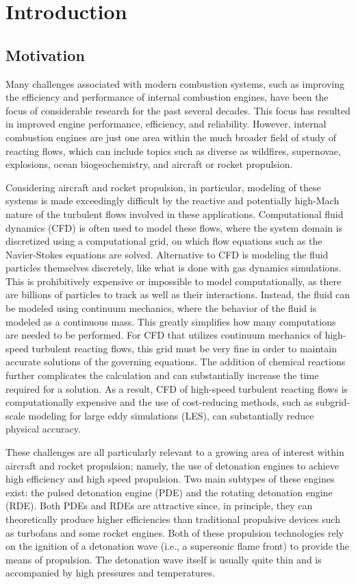 \chapter{Introduction}
\label{introchap}


\section{Motivation}
Many challenges associated with modern combustion systems, such as improving the efficiency and performance of internal combustion engines, have been the focus of considerable research for the past several decades. This focus has resulted in improved engine performance, efficiency, and reliability. However, internal combustion engines are just one area within the much broader field of study of reacting flows, which can include topics such as diverse as wildfires, supernovae, explosions, ocean biogeochemistry, and aircraft or rocket propulsion.

Considering aircraft and rocket propulsion, in particular, modeling of these systems is made exceedingly difficult by the reactive and potentially high-Mach nature of the turbulent flows involved in these applications. Computational fluid dynamics (CFD) is often used to model these flows, where the system domain is discretized using a computational grid, on which flow equations such as the Navier-Stokes equations are solved. Alternative to CFD is modeling the fluid particles themselves discretely, like what is done with gas dynamics simulations. This is prohibitively expensive or impossible to model computationally, as there are billions of particles to track as well as their interactions. Instead, the fluid can be modeled using continuum mechanics, where the behavior of the fluid is modeled as a continuous mass. This greatly simplifies how many computations are needed to be performed. For CFD that utilizes continuum mechanics of high-speed turbulent reacting flows, this grid must be very fine in order to maintain accurate solutions of the governing equations. The addition of chemical reactions further complicates the calculation and can substantially increase the time required for a solution. As a result, CFD of high-speed turbulent reacting flows is computationally expensive and the use of cost-reducing methods, such as subgrid-scale modeling for large eddy simulations (LES), can substantially reduce physical accuracy.  

These challenges are all particularly relevant to a growing area of interest within aircraft and rocket propulsion; namely, the use of detonation engines to achieve high efficiency and high speed propulsion. Two main subtypes of these engines exist: the pulsed detonation engine (PDE) and the rotating detonation engine (RDE). Both PDEs and RDEs are attractive since, in principle, they can theoretically produce higher efficiencies than traditional propulsive devices such as turbofans and some rocket engines. Both of these propulsion technologies rely on the ignition of a detonation wave (i.e., a supersonic flame front) to provide the means of propulsion. The detonation wave itself is usually quite thin and is accompanied by high pressures and temperatures. 

